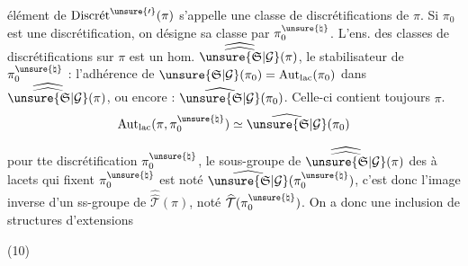 
 élément de $\operatorname{Discr\acute{e}t}^{\unsure{\prime}}(\pi)$ s'appelle une
classe de discrétifications de $\pi$.
Si $\pi_0$ est une discrétification, on désigne sa classe par
$\pi_0^{\unsure{\natural}}$. L'ens. des classes de discrétifications sur $\pi$
est un  hom. $\widehat{\widehat{\unsure{\mathfrak{S}|\mathcal{G}}}}(\pi)$, le stabilisateur
de $\pi_0^{\unsure{\natural}}$  : l'adhérence de
$\unsure{\mathfrak{S}|\mathcal{G}}(\pi_0)=\operatorname{Aut}_{\mathrm{lac}}(\pi_0)$ dans
$\widehat{\widehat{\unsure{\mathfrak{S}|\mathcal{G}}}}(\pi)$, ou encore :
$\widehat{\unsure{\mathfrak{S}|\mathcal{G}}}(\pi_0)$.
Celle-ci contient toujours $\pi$.
\[
\operatorname{Aut}_{\mathrm{lac}}(\pi,\pi_0^{\unsure{\natural}})
\simeq\widehat{\unsure{\mathfrak{S}|\mathcal{G}}}(\pi_0)
\]

 pour tte discrétification $\pi_0^{\unsure{\natural}}$, le sous-groupe de
$\widehat{\widehat{\unsure{\mathfrak{S}|\mathcal{G}}}}(\pi)$ des  à lacets qui fixent
$\pi_0^{\unsure{\natural}}$ est noté $\widehat{\unsure{\mathfrak{S}|\mathcal{G}}}(\pi_0^{\unsure{\natural}})$,
c'est donc l'image inverse d'un ss-groupe de
$\widehat{\widehat{\mathcal{T}}}(\pi)$, noté
$\widehat{\mathcal{T}}(\pi_0^{\unsure{\natural}})$. On a donc une inclusion de
structures d'extensions

\begin{samepage}
(10)
\end{samepage}


